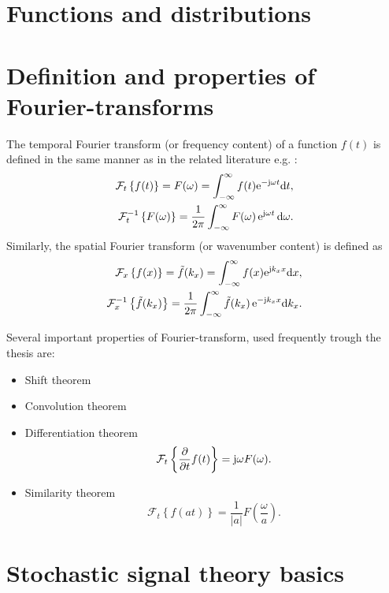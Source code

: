 \section{Functions and distributions}
\section{Definition and properties of Fourier-transforms}

The temporal Fourier transform (or frequency content) of a function $f(t)$ is defined in the same manner as in the related literature e.g. \cite{Ahrens2012, Ahrens2010a}:
%
\begin{align}
\mathcal{F}_{t} \left\{  f(t) \right\}  = F(\omega) = \int_{-\infty}^{\infty} f(t)  \mathrm{e}^{-\mathrm{j} \omega  t}  \mathrm{d} t, \\
\mathcal{F}^{-1}_{t} \left\{  F(\omega) \right\}  = \frac{1}{2\pi} \int_{-\infty}^{\infty} F(\omega)\, \mathrm{e}^{\mathrm{j} \omega  t} \, \mathrm{d} \omega.
\label{Eq:Math:Temp_Fourier}
\end{align}
%
Similarly, the spatial Fourier transform (or wavenumber content) is defined as
%
\begin{align}
\mathcal{F}_{x} \left\{  f(x) \right\}  = \tilde{f}(k_x) = \int_{-\infty}^{\infty} f(x) \mathrm{e}^{\mathrm{j} k_x x}\mathrm{d} x, \\
\mathcal{F}^{-1}_{x} \left\{  \tilde{f}(k_x) \right\}  = \frac{1}{2\pi} \int_{-\infty}^{\infty} \tilde{f}(k_x)\, \mathrm{e}^{-\mathrm{j} k_x x} \mathrm{d} k_x.
\end{align}

Several important properties of Fourier-transform, used frequently trough the thesis are:
\begin{itemize}
\item Shift theorem
%
\item Convolution theorem
%
\item Differentiation theorem
\begin{equation}
\mathcal{F}_{t} \left\{ \frac{\partial}{\partial t} f(t) \right\}  = \mathrm{j} \omega F(\omega).
\label{Eq:Math:Fourier_tr_diff}
\end{equation}
%
\item Similarity theorem
\begin{equation}
\mathcal{F}_{t} \left\{ f(a t) \right\}  = \frac{1}{|a|} F(\frac{\omega}{a}).
\label{Eq:Math:Fourier_tr_similarity}
\end{equation}
\end{itemize}
  

\section{Stochastic signal theory basics}

